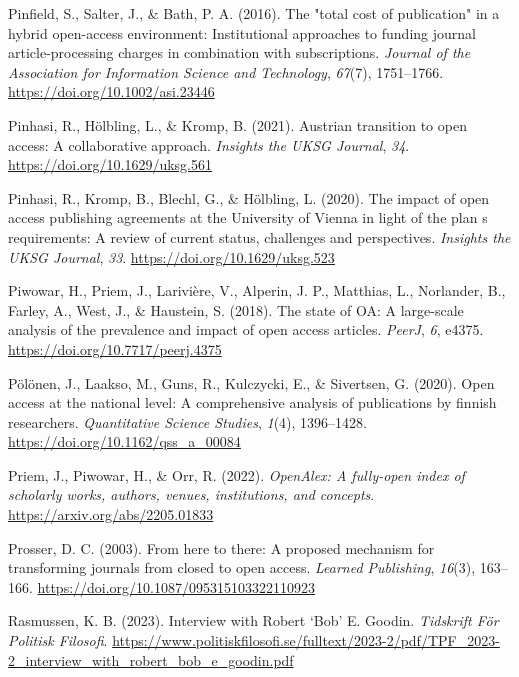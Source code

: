 \documentclass[a4paper,man,floatsintext,longtable,noextraspace,12pt]{apa6}
\newenvironment{CSLReferences}%
  {}%
  {\par}
\begin{document}
\begin{CSLReferences}{1}{0}
\leavevmode{}%
Pinfield, S., Salter, J., \& Bath, P. A. (2016). The "total cost of
publication" in a hybrid open-access environment: Institutional
approaches to funding journal article-processing charges in combination
with subscriptions. \emph{Journal of the Association for Information
Science and Technology}, \emph{67}(7), 1751--1766.
\url{https://doi.org/10.1002/asi.23446}

\leavevmode{}%
Pinhasi, R., Hölbling, L., \& Kromp, B. (2021). Austrian transition to
open access: A collaborative approach. \emph{Insights the UKSG Journal},
\emph{34}. \url{https://doi.org/10.1629/uksg.561}

\leavevmode{}%
Pinhasi, R., Kromp, B., Blechl, G., \& Hölbling, L. (2020). The impact
of open access publishing agreements at the {University of Vienna} in
light of the plan s requirements: A review of current status, challenges
and perspectives. \emph{Insights the UKSG Journal}, \emph{33}.
\url{https://doi.org/10.1629/uksg.523}

\leavevmode{}%
Piwowar, H., Priem, J., Larivière, V., Alperin, J. P., Matthias, L.,
Norlander, B., Farley, A., West, J., \& Haustein, S. (2018). The state
of {OA}: A large-scale analysis of the prevalence and impact of open
access articles. \emph{{PeerJ}}, \emph{6}, e4375.
\url{https://doi.org/10.7717/peerj.4375}

\leavevmode{}%
Pölönen, J., Laakso, M., Guns, R., Kulczycki, E., \& Sivertsen, G.
(2020). Open access at the national level: A comprehensive analysis of
publications by finnish researchers. \emph{Quantitative Science
Studies}, \emph{1}(4), 1396--1428.
\url{https://doi.org/10.1162/qss_a_00084}

\leavevmode{}%
Priem, J., Piwowar, H., \& Orr, R. (2022). \emph{OpenAlex: A fully-open
index of scholarly works, authors, venues, institutions, and concepts}.
\url{https://arxiv.org/abs/2205.01833}

\leavevmode{}%
Prosser, D. C. (2003). From here to there: A proposed mechanism for
transforming journals from closed to open access. \emph{Learned
Publishing}, \emph{16}(3), 163--166.
\url{https://doi.org/10.1087/095315103322110923}

\leavevmode{}%
Rasmussen, K. B. (2023). Interview with {Robert {`Bob'} E. Goodin}.
\emph{Tidskrift För Politisk Filosofi}.
\url{https://www.politiskfilosofi.se/fulltext/2023-2/pdf/TPF_2023-2_interview_with_robert_bob_e_goodin.pdf}


\end{CSLReferences}
\end{document}
